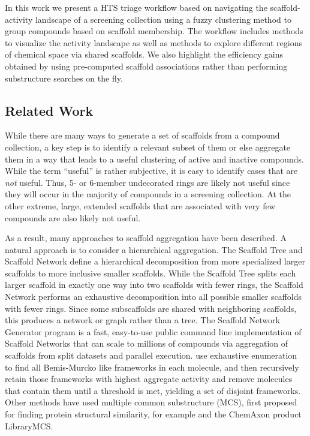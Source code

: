 \documentclass[journal=jacsat,manuscript=article]{achemso}
\begin{document}
In this work we present a HTS triage workflow based on navigating the
scaffold-activity landscape of a screening collection using a fuzzy clustering method to group compounds 
based on scaffold membership. The workflow includes
methods to visualize the activity landscape as well as methods to explore
different regions of chemical space via shared scaffolds. We also highlight the
efficiency gains obtained by using pre-computed scaffold associations rather
than performing substructure searches on the fly.

\subsection{Related Work}
While there are many ways to generate a set of scaffolds from a
compound collection, a key step is to identify a
relevant subset of them or else aggregate them in a way that leads to a useful
clustering of active and inactive compounds. While the term ``useful'' is rather
subjective, it is easy to identify cases that are \emph{not} useful. Thus, 5- or
6-member undecorated rings are likely not useful since they will occur in the
majority of compounds in a screening collection. At the other extreme, large,
extended scaffolds that are associated with very few compounds are also likely
not useful.

As a result, many approaches to scaffold aggregation have been described. A
natural approach is to consider a hierarchical aggregation. The Scaffold
Tree\cite{Ertl2011ScaffoldTree} and Scaffold Network\cite{Varin2011ScafNet}
define a hierarchical decomposition from more specialized larger scaffolds to
more inclusive smaller scaffolds. While the Scaffold Tree splits each larger
scaffold in exactly one way into two scaffolds with fewer rings, the Scaffold
Network performs an exhaustive decomposition into all possible smaller scaffolds
with fewer rings.  Since some subscaffolds are shared with neighboring
scaffolds, this produces a network or graph rather than a tree. The Scaffold
Network Generator program\cite{Matlock2013SNG} is a fast, easy-to-use public
command line implementation of Scaffold Networks that can scale to millions of
compounds via aggregation of scaffolds from split datasets and parallel
execution.  \citeauthor{Harper2004DDclus} use exhaustive enumeration to find all
Bemis-Murcko like frameworks in each molecule, and then recursively retain those
frameworks with highest aggregate activity and remove molecules that contain
them until a threshold is met, yielding a set of disjoint frameworks.  Other
methods have used multiple common substructure (MCS), first proposed for finding
protein structural similarity\cite{Koch1997MCSprot}, for example
\citeauthor{Quintus2009MCS} and the ChemAxon product LibraryMCS. 
\end{document}
